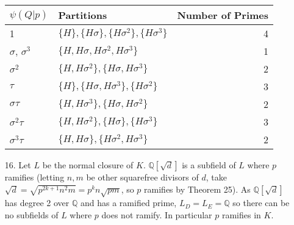 \documentclass{article}
\newcommand{\w}[0]{\omega}
\newcommand{\Q}[0]{\mathbb{Q}}
\newcommand{\Z}[0]{\mathbb{Z}}
\newcommand{\gal}[2]{\text{Gal}(#1 / #2)}
\begin{document}
\begin{enumerate}
\begin{tabular}{|l|l|r|}
    \hline
    $\psi(Q|p)$ & Partitions & Number of Primes \\
    \hline
    1 & $\{H\}, \{H\sigma\}, \{H\sigma^2\}, \{H\sigma^3\}$ & 4 \\
    $\sigma$, $\sigma^3$ & $\{H, H\sigma, H\sigma^2, H\sigma^3\}$ & 1\\
    $\sigma^2$ & $\{H, H\sigma^2\}, \{H\sigma, H\sigma^3\}$ & 2\\
    $\tau$ & $\{H\}, \{H\sigma, H\sigma^3\}, \{H\sigma^2\}$ & 3 \\
    $\sigma\tau$ & $\{H, H\sigma^3\}, \{H\sigma, H\sigma^2\}$ & 2 \\
    $\sigma^2\tau$ & $\{H, H\sigma^2\}, \{H\sigma\}, \{H\sigma^3\}$ & 3 \\
    $\sigma^3\tau$ & $\{H, H\sigma\}, \{H\sigma^2, H\sigma^3\}$ & 2 \\
    \hline
\end{tabular}







\item[16.] Let $L$ be the normal closure of $K$.  $\Q[\sqrt{d}]$ is a subfield of $L$ where $p$ ramifies (letting $n, m$ be other squarefree divisors of $d$, take $\sqrt{d} = \sqrt{p^{2k+1}n^2 m} = p^k n\sqrt{pm}$, so $p$ ramifies by Theorem 25).  As $\Q[\sqrt{d}]$ has degree 2 over $\Q$ and has a ramified prime, $L_{D} = L_{E} = \Q$ so there can be no subfields of $L$ where $p$ does not ramify.  In particular $p$ ramifies in $K$.


\end{enumerate}
\end{document}
